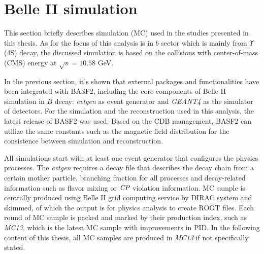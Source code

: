 \begin{comment}
\subsection{Summary}
BASF2 has been developed for an emphasis on providing reliable and high quality performance for Belle II analysis. It satisfies the most of demanding requirements of data taking, simulation, reconstruction, and offline analysis. 
\end{comment}

\section{Belle II simulation}

This section briefly describes simulation (MC) used in the studies presented in this thesis. As for the focus of this analysis is in $b$ sector which is mainly from $\Upsilon$(4S) decay, the discussed simulation is based on the collisions with center-of-mass (CMS) energy at $\sqrt{s} = 10.58 $ GeV.

In the previous section, it's shown that external packages and functionalities have been integrated with BASF2, including the core components of Belle II simulation in $B$ decay: \textit{evtgen} as event generator\cite{evtgen} and \textit{GEANT4} as the simulator of detectors\cite{agostinelli2003geant4}. For the simulation and the reconstruction used in this analysis, the latest release of BASF2 was used. Based on the CDB management, BASF2 can utilize the same constants such as the magnetic field distribution for the consistence between simulation and reconstruction.

 All simulations start with at least one event generator that configures the physics processes. The \textit{evtgen} requires a decay file that describes the decay chain from a certain mother particle, branching fraction for all processes and decay-related information such as flavor mixing or $\it{CP}$ violation information. MC sample is centrally produced using Belle II grid computing service by DIRAC system and skimmed, of which the output is for physics analysis to create ROOT files. Each round of MC sample is packed and marked by their production index, such as \textit{MC13}, which is the latest MC sample with improvements in PID. In the following content of this thesis, all MC samples are produced in \textit{MC13} if not specifically stated. 
 
